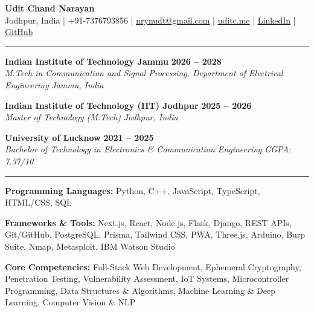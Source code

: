 \documentclass[10pt,letterpaper]{article}
\newcommand{\resumesection}[1]{%
  \vspace{5pt}
  \noindent{\large\textbf{#1}}
  \vspace{2pt}
  \hrule
  \vspace{2pt}
}
\newcommand{\subheading}[2]{%
  \noindent\textit{\textcolor{subheadinggrey}{#1}} \hfill \textit{\textcolor{subheadinggrey}{#2}}%
}
\begin{document}
{\centering
    {\Huge \textbf{Udit Chand Narayan}} \\
    \vspace{3pt}
    {\textcolor{subheadinggrey}{\small Jodhpur, India \quad | \quad +91-7376793856 \quad | \quad \href{mailto:nrynudt@gmail.com}{\underline{nrynudt@gmail.com}} \quad | \quad \href{https://uditc.me}{\underline{uditc.me}} \quad | \quad \href{https://linkedin.com/in/udit-chand-narayan-642253228}{\underline{LinkedIn}} \quad | \quad \href{https://github.com/anoonimouse}{\underline{GitHub}}}} \par}
\vspace{-4pt}

\resumesection{Education}
\noindent \textbf{Indian Institute of Technology Jammu} \hfill \textbf{2026 -- 2028} \\
\subheading{M.Tech in Communication and Signal Processing, Department of Electrical Engineering}{Jammu, India}
\vspace{4pt}

\noindent \textbf{Indian Institute of Technology (IIT) Jodhpur} \hfill \textbf{2025 -- 2026} \\
\subheading{Master of Technology (M.Tech)}{Jodhpur, India}
\vspace{4pt}

\noindent \textbf{University of Lucknow} \hfill \textbf{2021 -- 2025} \\
\subheading{Bachelor of Technology in Electronics \& Communication Engineering}{CGPA: 7.37/10}

\resumesection{Technical Skills}
\begin{list}{}{%
    \leftmargin=12pt
    \rightmargin=0pt
    \itemindent=0pt
    \parsep=2pt
    \itemsep=0pt
    \topsep=0pt
    \partopsep=0pt
}
\item \textbf{Programming Languages:} Python, C++, JavaScript, TypeScript, HTML/CSS, SQL
\item \textbf{Frameworks \& Tools:} Next.js, React, Node.js, Flask, Django, REST APIs, Git/GitHub, PostgreSQL, Prisma, Tailwind CSS, PWA, Three.js, Arduino, Burp Suite, Nmap, Metasploit, IBM Watson Studio
\item \textbf{Core Competencies:} Full-Stack Web Development, Ephemeral Cryptography, Penetration Testing, Vulnerability Assessment, IoT Systems, Microcontroller Programming, Data Structures \& Algorithms, Machine Learning \& Deep Learning, Computer Vision \& NLP
\end{list}
\end{document}

